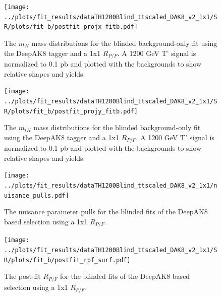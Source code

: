 \documentclass[10pt,oneside]{article}
\begin{document}
\begin{figure}[H]
    \centering
    \texttt{[image: ../plots/fit\_results/dataTH1200Blind\_ttscaled\_DAK8\_v2\_1x1/SR/plots/fit\_b/postfit\_projx\_fitb.pdf]}
    \caption{The $m_H$ mass distributions for the blinded background-only fit using the DeepAK8 tagger and a 1x1 $R_{P/F}$.
    A 1200 GeV T' signal is normalized to 0.1 pb and plotted with the backgrounds to show relative shapes and yields.}
    \label{figs:DAK8_mh_1x1}
\end{figure}
\begin{figure}[H]
    \centering
    \texttt{[image: ../plots/fit\_results/dataTH1200Blind\_ttscaled\_DAK8\_v2\_1x1/SR/plots/fit\_b/postfit\_projy\_fitb.pdf]}
    \caption{The $m_{tH}$ mass distributions for the blinded background-only fit using the DeepAK8 tagger and a 1x1 $R_{P/F}$.
    A 1200 GeV T' signal is normalized to 0.1 pb and plotted with the backgrounds to show relative shapes and yields.}
    \label{figs:DAK8_mth_1x1}
\end{figure}
\begin{figure}[H]
    \centering
    \texttt{[image: ../plots/fit\_results/dataTH1200Blind\_ttscaled\_DAK8\_v2\_1x1/nuisance\_pulls.pdf]}
    \caption{The nuisance parameter pulls for the blinded fits of the DeepAK8 based selection using a 1x1 $R_{P/F}$.}
    \label{figs:DAK8_nuis_1x1}
\end{figure}
\begin{figure}[H]
    \centering
    \texttt{[image: ../plots/fit\_results/dataTH1200Blind\_ttscaled\_DAK8\_v2\_1x1/SR/plots/fit\_b/postfit\_rpf\_surf.pdf]}
    \caption{The post-fit $R_{P/F}$ for the blinded fits of the DeepAK8 based selection using a 1x1 $R_{P/F}$.}
    \label{figs:DAK8_rpf_1x1}
\end{figure}
\end{document}
